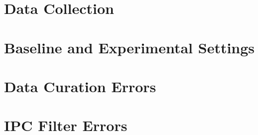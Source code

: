 \section{Data Collection}
\label{sec:DataCollection}

\section{Baseline and Experimental Settings}
\label{sec:settings}

\section{Data Curation Errors}
\label{sec:DataCurationErrors}

\section{IPC Filter Errors}
\label{sec:IPCFilterErrors}




